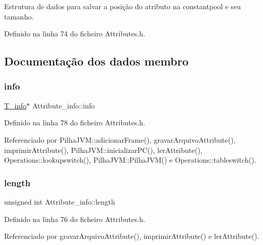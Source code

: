 Estrutura de dados para salvar a posição do atributo na constantpool e seu tamanho. 

Definido na linha 74 do ficheiro Attributes.\+h.



\subsection{Documentação dos dados membro}
\mbox{\label{structAttribute__info_a8612e1228cbf9673986c9fee603dceca}} 
\subsubsection{\texorpdfstring{info}{info}}
{\footnotesize\ttfamily \hyperlink{unionT__info}{T\+\_\+info}$\ast$ Attribute\+\_\+info\+::info}



Definido na linha 78 do ficheiro Attributes.\+h.



Referenciado por Pilha\+J\+V\+M\+::adicionar\+Frame(), gravar\+Arquivo\+Attribute(), imprimir\+Attribute(), Pilha\+J\+V\+M\+::inicializar\+P\+C(), ler\+Attribute(), Operations\+::lookupswitch(), Pilha\+J\+V\+M\+::\+Pilha\+J\+V\+M() e Operations\+::tableswitch().

\mbox{\label{structAttribute__info_aa76577f95471a7093757bb127f24702f}} 
\subsubsection{\texorpdfstring{length}{length}}
{\footnotesize\ttfamily unsigned int Attribute\+\_\+info\+::length}



Definido na linha 76 do ficheiro Attributes.\+h.



Referenciado por gravar\+Arquivo\+Attribute(), imprimir\+Attribute() e ler\+Attribute().

\mbox{\label{structAttribute__info_aa20aae72733ad98febeea64ad7927526}} 
